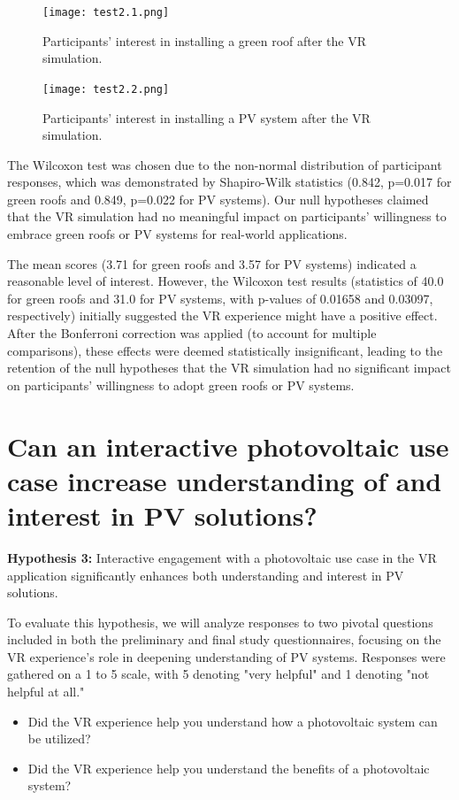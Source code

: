 \documentclass[draft, final]{vutinfth} %
\begin{document}
\begin{figure}[h]
\centering
\texttt{[image: test2.1.png]}
\caption[Interest in green roof installation post-VR]{Participants' interest in installing a green roof after the VR simulation.}
\label{fig:interest-green-roof}
\end{figure}

\begin{figure}[h]
\centering
\texttt{[image: test2.2.png]}
\caption[Interest in PV system installation post-VR]{Participants' interest in installing a PV system after the VR simulation.}
\label{fig:interest-pv-system}
\end{figure}

The Wilcoxon test was chosen due to the non-normal distribution of participant responses, which was demonstrated by Shapiro-Wilk statistics (0.842, p=0.017 for green roofs and 0.849, p=0.022 for PV systems). Our null hypotheses claimed that the VR simulation had no meaningful impact on participants' willingness to embrace green roofs or PV systems for real-world applications.

The mean scores (3.71 for green roofs and 3.57 for PV systems) indicated a reasonable level of interest. However, the Wilcoxon test results (statistics of 40.0 for green roofs and 31.0 for PV systems, with p-values of 0.01658 and 0.03097, respectively) initially suggested the VR experience might have a positive effect. After the Bonferroni correction was applied (to account for multiple comparisons), these effects were deemed statistically insignificant, leading to the retention of the null hypotheses that the VR simulation had no significant impact on participants' willingness to adopt green roofs or PV systems.

\section{Can an interactive photovoltaic use case increase understanding of and interest in PV solutions?}

\textbf{Hypothesis 3:} Interactive engagement with a photovoltaic use case in the VR application significantly enhances both understanding and interest in PV solutions.

To evaluate this hypothesis, we will analyze responses to two pivotal questions included in both the preliminary and final study questionnaires, focusing on the VR experience's role in deepening understanding of PV systems. Responses were gathered on a 1 to 5 scale, with 5 denoting "very helpful" and 1 denoting "not helpful at all."
\begin{itemize}
    \item Did the VR experience help you understand how a photovoltaic system can be utilized?
    \item Did the VR experience help you understand the benefits of a photovoltaic system?
\end{itemize}
\end{document}
